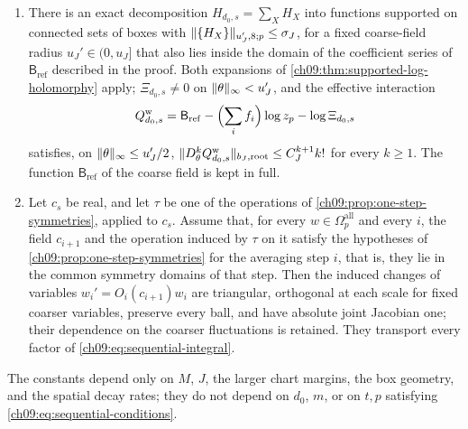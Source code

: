 \begin{theorem}
\begin{enumerate}
\begin{equation}
 H_{d_0,s}(\theta,w)=\sum_i\Bigl[U_i^{\mathrm{cl}}+\mathcal L_i(c_{i+1},z_i)-\mathcal L_i(c_{i+1},z_i^*(c_{i+1}))+\mathsf B_i(c_{i+1})-\mathsf B_i(\widehat c_{i+1})\Bigr].
\end{equation}
If $\mathscr D_s(c_s)$ is the image of $\Omega_p^{\mathrm{all}}$ under $w\mapsto(z_i)_{i<s}$, then
\begin{equation}\label{ch09:eq:sequential-integral}
\begin{split}
 &\int_{\mathscr D_s(c_s)}e^{-E_{d_0}(c_0)/g_0^2}\prod_i\mathcal J_i(c_{i+1},z_i)\,dz_i\\
 &\qquad=\Bigl(\prod_i\mathcal J_i(I,0)g_i^{D_i}\Bigr)e^{-E_{d_0+s}(c_s)/g_s^2-\mathsf B_{\mathrm{ref}}(c_s)}z_p^{\sum_if_i}\,\Xi_{d_0,s}(c_s),
\end{split}
\end{equation}
where $\Xi_{d_0,s}=\E_{\pi_p^{\mathrm{all}}}e^{-H_{d_0,s}}$.
\item There is an exact decomposition $H_{d_0,s}=\sum_XH_X$ into functions supported on connected sets of boxes with $\lVert \{H_X\}\rVert_{u_J',8;p}\le\sigma_J$, for a fixed coarse-field radius $u_J'\in(0,u_J]$ that also lies inside the domain of the coefficient series of $\mathsf B_{\mathrm{ref}}$ described in the proof. Both expansions of \cref{ch09:thm:supported-log-holomorphy} apply; $\Xi_{d_0,s}\ne0$ on $\lVert \theta\rVert_\infty<u_J'$, and the effective interaction
\[
 Q_{d_0,s}^{\mathrm w}=\mathsf B_{\mathrm{ref}}-\Bigl(\sum_if_i\Bigr)\log z_p-\log\Xi_{d_0,s}
\]
satisfies, on $\lVert \theta\rVert_\infty\le u_J'/2$, $\lVert D_\theta^kQ_{d_0,s}^{\mathrm w}\rVert_{b_J,\mathrm{root}}\le C_J^{k+1}k!$ for every $k\ge1$. The function $\mathsf B_{\mathrm{ref}}$ of the coarse field is kept in full.
\item Let $c_s$ be real, and let $\tau$ be one of the operations of \cref{ch09:prop:one-step-symmetries}, applied to $c_s$. Assume that, for every $w\in\Omega_p^{\mathrm{all}}$ and every $i$, the field $c_{i+1}$ and the operation induced by $\tau$ on it satisfy the hypotheses of \cref{ch09:prop:one-step-symmetries} for the averaging step $i$, that is, they lie in the common symmetry domains of that step. Then the induced changes of variables $w_i'=O_i(c_{i+1})w_i$ are triangular, orthogonal at each scale for fixed coarser variables, preserve every ball, and have absolute joint Jacobian one; their dependence on the coarser fluctuations is retained. They transport every factor of \eqref{ch09:eq:sequential-integral}.
\end{enumerate}
The constants depend only on $M$, $J$, the larger chart margins, the box geometry, and the spatial decay rates; they do not depend on $d_0$, $m$, or on $t,p$ satisfying \eqref{ch09:eq:sequential-conditions}.
\end{theorem}

